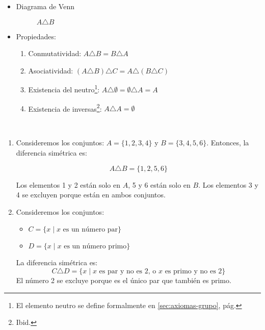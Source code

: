 \begin{itemize}
	\item Diagrama de Venn
		\begin{figure}[H]
			\centering
			\begin{venndiagram2sets}
				\fillOnlyA \fillOnlyB
			\end{venndiagram2sets}
			\caption*{$A \triangle B$}
		\end{figure}
	
	\item Propiedades:
	\begin{enumerate}[label=\roman*)]
		\item Conmutatividad: \(A \triangle B = B \triangle A\)
		\item Asociatividad: \((A \triangle B) \triangle C = A \triangle (B \triangle C)\)
		\item Existencia del neutro\footnote{El elemento neutro se define formalmente en \ref{sec:axiomas-grupo}, pág. \pageref{sec:axiomas-grupo}}: \( A \triangle \emptyset = \emptyset \triangle A = A \)
		\item Existencia de inversas\footnote{Ibid.}: \( A \triangle A = \emptyset \)
	\end{enumerate}
\end{itemize}

\begin{example}
	\
	\begin{enumerate}
		\item Consideremos los conjuntos: \(A = \{1, 2, 3, 4\}\) y \(B = \{3, 4, 5, 6\}\). Entonces, la diferencia simétrica es:
		
		$$A \triangle B = \{1, 2, 5, 6\}$$
		
		Los elementos 1 y 2 están solo en \(A\), 5 y 6 están solo en \(B\). Los elementos 3 y 4 se excluyen porque están en ambos conjuntos.
		
		\item Consideremos los conjuntos:
		\begin{itemize}
			\item \(C = \{x \mid x \mbox{ es un número par}\}\)
			\item \(D = \{x \mid x \mbox{ es un número primo}\}\)
		\end{itemize}
		
		La diferencia simétrica es:
		$$C \triangle D = \{x \mid x \text{ es par y no es 2, o } x \text{ es primo y no es 2}\}$$
		El número 2 se excluye porque es el único par que también es primo.
	\end{enumerate}
\end{example}



